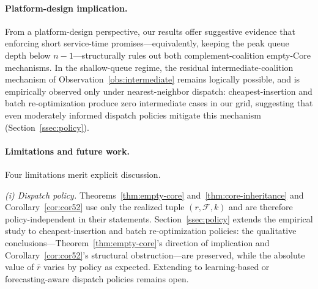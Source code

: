 \documentclass[11pt]{article}
\theoremstyle{plain}
\theoremstyle{definition}
\theoremstyle{remark}
\newcommand{\F}{\mathcal{F}}
\begin{document}
\paragraph{Platform-design implication.} From a platform-design perspective, our results offer suggestive evidence that enforcing short service-time promises---equivalently, keeping the peak queue depth below $n-1$---structurally rules out both complement-coalition empty-Core mechanisms. In the shallow-queue regime, the residual intermediate-coalition mechanism of Observation~\ref{obs:intermediate} remains logically possible, and is empirically observed only under nearest-neighbor dispatch: cheapest-insertion and batch re-optimization produce zero intermediate cases in our grid, suggesting that even moderately informed dispatch policies mitigate this mechanism (Section~\ref{ssec:policy}).

\paragraph{Limitations and future work.} Four limitations merit explicit discussion.

\emph{(i) Dispatch policy.} Theorems~\ref{thm:empty-core} and~\ref{thm:core-inheritance} and Corollary~\ref{cor:cor52} use only the realized tuple $(r, \F, k)$ and are therefore policy-independent in their statements. Section~\ref{ssec:policy} extends the empirical study to cheapest-insertion and batch re-optimization policies: the qualitative conclusions---Theorem~\ref{thm:empty-core}'s direction of implication and Corollary~\ref{cor:cor52}'s structural obstruction---are preserved, while the absolute value of $\bar r$ varies by policy as expected. Extending to learning-based or forecasting-aware dispatch policies remains open.
\end{document}
